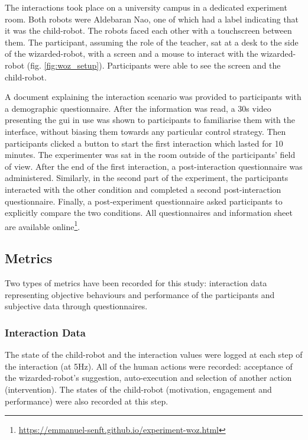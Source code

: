 The interactions took place on a university campus in a dedicated experiment room. Both robots were Aldebaran Nao, one of which had a label indicating that it was the child-robot. The robots faced each other with a touchscreen between them. The participant, assuming the role of the teacher, sat at a desk to the side of the wizarded-robot, with a screen and a mouse to interact with the wizarded-robot (fig. \ref{fig:woz_setup}). Participants were able to see the screen and the child-robot.

A document explaining the interaction scenario was provided to participants with a demographic questionnaire. After the information was read, a 30s video presenting the \gls{gui} in use was shown to participants to familiarise them with the interface, without biasing them towards any particular control strategy. Then participants clicked a button to start the first interaction which lasted for 10 minutes. The experimenter was sat in the room outside of the participants' field of view. After the end of the first interaction, a post-interaction questionnaire was administered. Similarly, in the second part of the experiment, the participants interacted with the other condition and completed a second post-interaction questionnaire. Finally, a post-experiment questionnaire asked participants to explicitly compare the two conditions. All questionnaires and information sheet are available online\footnote{ \url{https://emmanuel-senft.github.io/experiment-woz.html}}.

\subsection{Metrics}

Two types of metrics have been recorded for this study: interaction data representing objective behaviours and performance of the participants and subjective data through questionnaires.

\subsubsection{Interaction Data}

The state of the child-robot and the interaction values were logged at each step of the interaction (at 5Hz). All of the human actions were recorded: acceptance of the wizarded-robot's suggestion, auto-execution and selection of another action (intervention). The states of the child-robot (motivation, engagement and performance) were also recorded at this step. 

